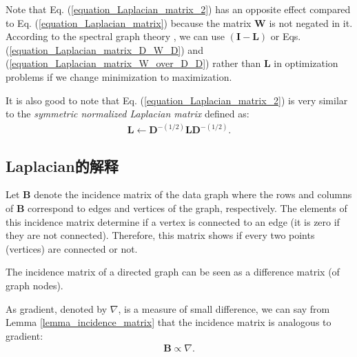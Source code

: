 \documentclass[lang=cn,10pt]{gorgeousnbook}
\numberwithin{equation}{section}%
\numberwithin{figure}{section}%
\begin{document}
Note that Eq. (\ref{equation_Laplacian_matrix_2}) has an opposite effect compared to Eq. (\ref{equation_Laplacian_matrix}) because the matrix $\boldsymbol{W}$ is not negated in it. 
According to the spectral graph theory \cite{chung1997spectral}, we can use $(\boldsymbol{I} - \boldsymbol{L})$ or Eqs. (\ref{equation_Laplacian_matrix_D_W_D}) and (\ref{equation_Laplacian_matrix_W_over_D_D}) rather than $\boldsymbol{L}$ in optimization problems if we change minimization to maximization.

It is also good to note that Eq. (\ref{equation_Laplacian_matrix_2}) is very similar to the \textit{symmetric normalized Laplacian matrix} defined as:
\begin{align}
\boldsymbol{L} \gets \boldsymbol{D}^{-(1/2)} \boldsymbol{L} \boldsymbol{D}^{-(1/2)}.
\end{align}

\subsection{Laplacian的解释}


Let $\boldsymbol{B}$ denote the incidence matrix of the data graph where the rows and columns of $\boldsymbol{B}$ correspond to edges and vertices of the graph, respectively. 
The elements of this incidence matrix determine if a vertex is connected to an edge (it is zero if they are not connected). Therefore, this matrix shows if every two points (vertices) are connected or not. 

\begin{lemma}\label{lemma_incidence_matrix}
The incidence matrix of a directed graph can be seen as a difference matrix (of graph nodes). 
\end{lemma}

\begin{corollary}
As gradient, denoted by $\nabla$, is a measure of small difference, we can say from Lemma \ref{lemma_incidence_matrix} that the incidence matrix is analogous to gradient:
\begin{align}\label{equation_incidence_and_gradient}
\boldsymbol{B} \propto \nabla.
\end{align}
\end{corollary}
\end{document}
